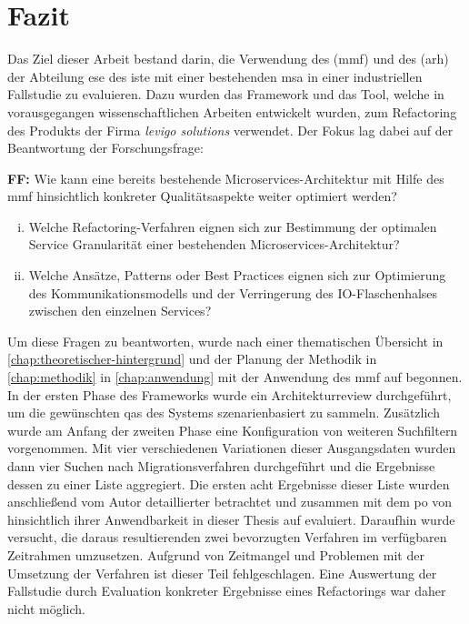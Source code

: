 \chapter{Fazit}
\label{chap:fazit}

Das Ziel dieser Arbeit bestand darin, die Verwendung des  (\acrshort{mmf}) und des  (\acrshort{arh}) der Abteilung \acrfull{ese} des \acrfull{iste} mit einer bestehenden \acrfull{msa} in einer industriellen Fallstudie zu evaluieren.
Dazu wurden das Framework und das Tool, welche in vorausgegangen wissenschaftlichen Arbeiten entwickelt wurden, zum Refactoring des Produkts \jf der Firma \emph{levigo solutions} verwendet.
Der Fokus lag dabei auf der Beantwortung der Forschungsfrage:

\textbf{FF:} Wie kann eine bereits bestehende Microservices-Architektur mit Hilfe des \acrfull{mmf} hinsichtlich konkreter Qualitätsaspekte weiter optimiert werden?
\begin{enumerate}[i.]
	\item Welche Refactoring-Verfahren eignen sich zur Bestimmung der optimalen Service Granularität einer bestehenden Microservices-Architektur?
	\item Welche Ansätze, Patterns oder Best Practices eignen sich zur Optimierung des Kom\-mu\-ni\-ka\-tions\-mo\-dells und der Verringerung des IO-Flaschenhalses zwischen den einzelnen Services?
\end{enumerate}
Um diese Fragen zu beantworten, wurde nach einer thematischen Übersicht in \cref{chap:theoretischer-hintergrund} und der Planung der Methodik in \cref{chap:methodik} in \cref{chap:anwendung} mit der Anwendung des \gls{mmf} auf \jf begonnen.
In der ersten Phase des Frameworks wurde ein Architekturreview durchgeführt, um die gewünschten \glspl{qa} des Systems szenarienbasiert zu sammeln.
Zusätzlich wurde am Anfang der zweiten Phase eine Konfiguration von weiteren Suchfiltern vorgenommen.
Mit vier verschiedenen Variationen dieser Ausgangsdaten wurden dann vier Suchen nach Migrationsverfahren durchgeführt und die Ergebnisse dessen zu einer Liste aggregiert.
Die ersten acht Ergebnisse dieser Liste wurden anschließend vom Autor detaillierter betrachtet und zusammen mit dem \gls{po} von \jf hinsichtlich ihrer Anwendbarkeit in dieser Thesis auf \jf evaluiert.
Daraufhin wurde versucht, die daraus resultierenden zwei bevorzugten Verfahren im verfügbaren Zeitrahmen umzusetzen.
Aufgrund von Zeitmangel und Problemen mit der Umsetzung der Verfahren ist dieser Teil fehlgeschlagen.
Eine Auswertung der Fallstudie durch Evaluation konkreter Ergebnisse eines Refactorings war daher nicht möglich.

